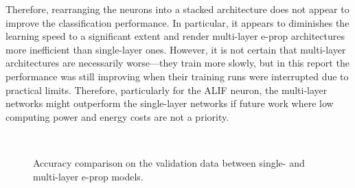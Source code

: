 		Therefore, rearranging the neurons into a stacked architecture does not appear to improve the classification performance.
		In particular, it appears to diminishes the learning speed to a significant extent and render multi-layer e-prop architectures more inefficient than single-layer ones.
		However, it is not certain that multi-layer architectures are necessarily worse---they train more slowly, but in this report the performance was still improving when their training runs were interrupted due to practical limits.
		Therefore, particularly for the ALIF neuron, the multi-layer networks might outperform the single-layer networks if future work where low computing power and energy costs are not a priority.

		\begin{figure}[bth]
		    \myfloatalign
		     \quad
		     \\
		    \caption[Single- and multi-layer accuracy comparison]{Accuracy comparison on the validation data between single- and multi-layer e-prop models.}\label{fig:ml-percwrong}
		\end{figure}


